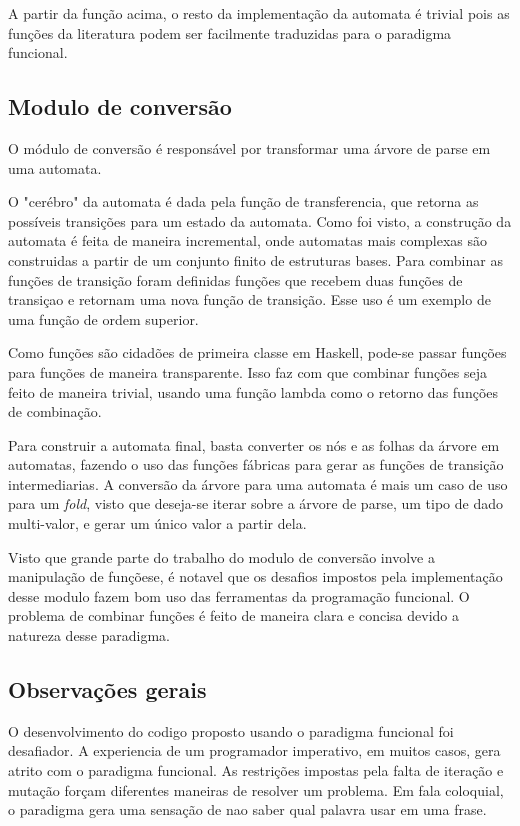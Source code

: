 A partir da função acima, o resto da implementação da automata é trivial pois as funções da literatura podem ser facilmente traduzidas para o paradigma funcional.

\subsection{Modulo de conversão}
O módulo de conversão é responsável por transformar uma árvore de parse em uma automata.

O "cerébro" da automata é dada pela função de transferencia, que retorna as possíveis transições para um estado da automata.
Como foi visto, a construção da automata é feita de maneira incremental, onde automatas mais complexas são construidas a partir de um conjunto finito de estruturas bases.
Para combinar as funções de transição foram definidas funções que recebem duas funções de transiçao e retornam uma nova função de transição.
Esse uso é um exemplo de uma função de ordem superior.

Como funções são cidadões de primeira classe em Haskell, pode-se passar funções para funções de maneira transparente.
Isso faz com que combinar funções seja feito de maneira trivial, usando uma função lambda como o retorno das funções de combinação.

Para construir a automata final, basta converter os nós e as folhas da árvore em automatas, fazendo o uso das funções fábricas para gerar as funções de transição intermediarias.
A conversão da árvore para uma automata é mais um caso de uso para um \emph{fold}, visto que deseja-se iterar sobre a árvore de parse, um tipo de dado multi-valor, e gerar um único valor a partir dela.

Visto que grande parte do trabalho do modulo de conversão involve a manipulação de funçõese, é notavel que os desafios impostos pela implementação desse modulo fazem bom uso das ferramentas da programação funcional.
O problema de combinar funções é feito de maneira clara e concisa devido a natureza desse paradigma.

\subsection{Observações gerais}

O desenvolvimento do codigo proposto usando o paradigma funcional foi desafiador.
A experiencia de um programador imperativo, em muitos casos, gera atrito com o paradigma funcional.
As restrições impostas pela falta de iteração e mutação forçam diferentes maneiras de resolver um problema.
Em fala coloquial, o paradigma gera uma sensação de nao saber qual palavra usar em uma frase.

